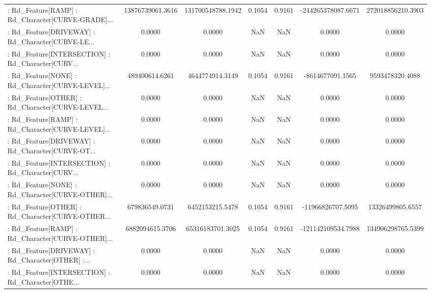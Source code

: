 \begin{longtable}{p{4cm}cccccc}
 : Rd\_Feature[RAMP] : Rd\_Character[CURVE-GRADE]... &  13876739061.3616 & 131700548788.1942 &  0.1054 &       0.9161 & -244265378087.6671 & 272018856210.3903 \\
 : Rd\_Feature[DRIVEWAY] : Rd\_Character[CURVE-LE... &            0.0000 &            0.0000 &     NaN &          NaN &             0.0000 &            0.0000 \\
 : Rd\_Feature[INTERSECTION] : Rd\_Character[CURV... &            0.0000 &            0.0000 &     NaN &          NaN &             0.0000 &            0.0000 \\
 : Rd\_Feature[NONE] : Rd\_Character[CURVE-LEVEL]... &    489400614.6261 &   4644774914.3149 &  0.1054 &       0.9161 &   -8614677091.1565 &   9593478320.4088 \\
 : Rd\_Feature[OTHER] : Rd\_Character[CURVE-LEVEL... &            0.0000 &            0.0000 &     NaN &          NaN &             0.0000 &            0.0000 \\
 : Rd\_Feature[RAMP] : Rd\_Character[CURVE-LEVEL]... &            0.0000 &            0.0000 &     NaN &          NaN &             0.0000 &            0.0000 \\
 : Rd\_Feature[DRIVEWAY] : Rd\_Character[CURVE-OT... &            0.0000 &            0.0000 &     NaN &          NaN &             0.0000 &            0.0000 \\
 : Rd\_Feature[INTERSECTION] : Rd\_Character[CURV... &            0.0000 &            0.0000 &     NaN &          NaN &             0.0000 &            0.0000 \\
 : Rd\_Feature[NONE] : Rd\_Character[CURVE-OTHER]... &            0.0000 &            0.0000 &     NaN &          NaN &             0.0000 &            0.0000 \\
 : Rd\_Feature[OTHER] : Rd\_Character[CURVE-OTHER... &    679836549.0731 &   6452153215.5478 &  0.1054 &       0.9161 &  -11966826707.5095 &  13326499805.6557 \\
 : Rd\_Feature[RAMP] : Rd\_Character[CURVE-OTHER]... &   6882094615.3706 &  65316183701.3025 &  0.1054 &       0.9161 & -121142109534.7988 & 134906298765.5399 \\
 : Rd\_Feature[DRIVEWAY] : Rd\_Character[OTHER] :... &            0.0000 &            0.0000 &     NaN &          NaN &             0.0000 &            0.0000 \\
 : Rd\_Feature[INTERSECTION] : Rd\_Character[OTHE... &            0.0000 &            0.0000 &     NaN &          NaN &             0.0000 &            0.0000 \\

\end{longtable}
